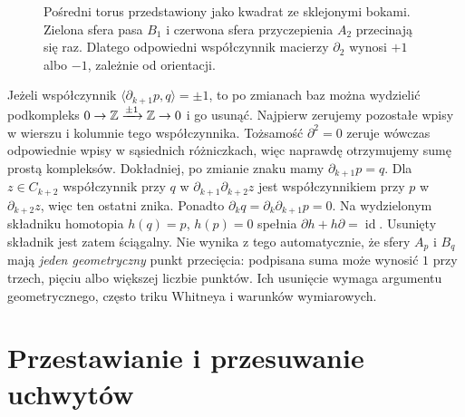 \begin{figure}[htbp]
\centering
{}
\caption{Pośredni torus przedstawiony jako kwadrat
ze sklejonymi bokami. Zielona sfera pasa
$B_1$ i czerwona sfera przyczepienia
$A_2$ przecinają się raz. Dlatego odpowiedni
współczynnik macierzy $\partial_2$ wynosi
$+1$ albo $-1$, zależnie od orientacji.}
\label{fig:przeciecie-uchwytow-18}
\end{figure}

\begin{uwaga}
Jeżeli współczynnik
$\langle\partial_{k+1}p,q\rangle=\pm1$,
to po zmianach baz można wydzielić podkompleks
$0\to\mathbb{Z}\xrightarrow{\pm1}\mathbb{Z}\to0$ i go usunąć.
Najpierw zerujemy pozostałe wpisy w wierszu i kolumnie
tego współczynnika. Tożsamość $\partial^2=0$
zeruje wówczas odpowiednie wpisy w sąsiednich
różniczkach, więc naprawdę otrzymujemy sumę prostą
kompleksów. Dokładniej, po zmianie znaku mamy
$\partial_{k+1}p=q$. Dla $z\in C_{k+2}$ współczynnik przy $q$
w $\partial_{k+1}\partial_{k+2}z$ jest współczynnikiem przy $p$
w $\partial_{k+2}z$, więc ten ostatni znika.
Ponadto $\partial_k q=\partial_k\partial_{k+1}p=0$.
Na wydzielonym składniku homotopia $h(q)=p$, $h(p)=0$
spełnia $\partial h+h\partial=\operatorname{id}$.
Usunięty składnik jest zatem ściągalny.
Nie wynika z tego automatycznie, że
sfery $A_p$ i $B_q$ mają \emph{jeden
geometryczny} punkt przecięcia:
podpisana suma może wynosić $1$
przy trzech, pięciu albo większej
liczbie punktów. Ich usunięcie wymaga
argumentu geometrycznego, często
triku Whitneya i warunków wymiarowych.
\end{uwaga}

\section{Przestawianie i przesuwanie uchwytów}
\label{sec:ruchy-uchwytow-18}

